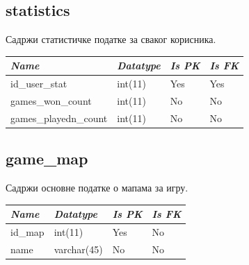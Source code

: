 \subsection{statistics}
Садржи статистичке податке за сваког корисника.

\begin{table}[h!]
\centering
\small

    \begin{tabular}{ | m{} | m{} | m{} | m{} | }
    \hline
        \cellcolor{blue!25}\textbf{\textit{Name}} &

        \cellcolor{blue!25}\textbf{\textit{Datatype}} &
        \cellcolor{blue!25}\textbf{\textit{Is PK}} &
        \cellcolor{blue!25}\textbf{\textit{Is FK}} \\
    \hline
    \hline
        id\_user\_stat & int(11) & Yes & Yes \\
    \hline
        games\_won\_count & int(11) & No & No \\
    \hline
        games\_playedn\_count & int(11) & No & No \\
    \hline
    \end{tabular}

\end{table}

\subsection{game\_map}
Садржи основне податке о мапама за игру.

\begin{table}[h!]
\centering
\small

    \begin{tabular}{ | m{} | m{} | m{} | m{} | }
    \hline
        \cellcolor{blue!25}\textbf{\textit{Name}} &

        \cellcolor{blue!25}\textbf{\textit{Datatype}} &
        \cellcolor{blue!25}\textbf{\textit{Is PK}} &
        \cellcolor{blue!25}\textbf{\textit{Is FK}} \\
    \hline
    \hline
        id\_map & int(11) & Yes & No \\
    \hline
        name & varchar(45) & No & No \\
    \hline
    \end{tabular}

\end{table}

\newpage

